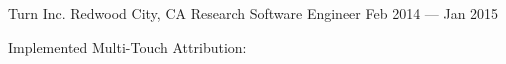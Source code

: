 \documentclass [11pt] {resume}
\begin{document}
  \begin{cventries}

      \begin{cventries}
        \cventry
        {Turn Inc.}
        {Redwood City, CA}
        {Research Software Engineer}
        {Feb 2014 — Jan 2015}
        {\item {Implemented Multi-Touch Attribution: }}
      \end{cventries}



\end{cventries}
\end{document}
